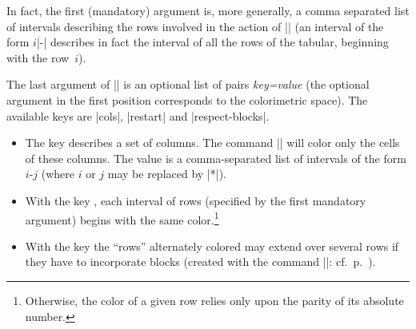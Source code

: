 \documentclass[dvipsnames]{article}%
\begin{document}
\begin{itemize}
In fact, the first (mandatory) argument is, more generally, a comma separated
list of intervals describing the rows involved in the action of |\rowcolors|
(an interval of the form $i$|-| describes in fact the interval of all the rows
of the tabular, beginning with the row~$i$).


\bigskip
The last argument of |\rowcolors| is an optional list of pairs
\textsl{key=value} (the optional argument in the first position corresponds to
the colorimetric space). The available keys are |cols|, |restart| and
|respect-blocks|.


\begin{itemize}
\item The key  describes a set of columns. The command
|\rowcolors| will color only the cells of these columns. The value is a
comma-separated list of intervals of the form $i$-$j$ (where $i$ or $j$ may be
replaced by |*|).
\item With the key , each interval of rows (specified by the
first mandatory argument) begins with the same color.\footnote{Otherwise, the color
of a given row relies only upon the parity of its absolute number.}
\item With the key  the ``rows'' alternately colored
may extend over several rows if they have to incorporate blocks (created with
the command |\Block|: cf.~p.~\pageref{Block}).
\end{itemize}


\end{itemize}
\end{document}
